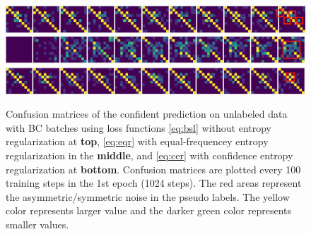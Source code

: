 \begin{figure}[h]
\centering
\includegraphics[width=14cm]{fig/eta0.png}\\
\includegraphics[width=14cm]{fig/2eta005.png}\\
\includegraphics[width=14cm]{fig/eta005.png}
\caption{Confusion matrices of the confident prediction on unlabeled data with BC batches using loss functions \eqref{eq:bsl} without entropy regularization at \textbf{top}, 
\eqref{eq:eqr} with equal-frequencey entropy regularization in the \textbf{middle},
and \eqref{eq:cer} with confidence entropy regularization at \textbf{bottom}. Confusion matrices are plotted every 100 training steps in the 1st epoch (1024 steps). The red areas represent the asymmetric/symmetric noise in the pseudo labels. The yellow color represents larger value and the darker green color represents smaller values.
}\label{fig:cfmx_eta}
\end{figure}

